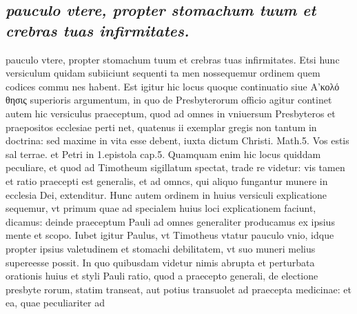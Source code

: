 \documentclass{article}
\begin{document}
\begin{pages}
\subsection*{\textit{pauculo vtere, propter stomachum tuum et crebras tuas infirmitates.}}pauculo vtere, propter stomachum tuum et crebras tuas infirmitates. Etsi hunc versiculum quidam subiiciunt sequenti ta men nossequemur ordinem quem codices commu nes habent. Est igitur hic locus quoque continuatio siue Α’κολό θησις superioris argumentum, in quo de Presbyterorum officio agitur continet autem hic versiculus praeceptum, quod ad omnes in vniuersum Presbyteros et praepositos ecclesiae perti net, quatenus ii exemplar gregis non tantum in doctrina: sed maxime in vita esse debent, iuxta dictum Christi. Math.5. Vos estis sal terrae. et Petri in 1.epistola cap.5. Quamquam enim hic locus quiddam peculiare, et quod ad Timotheum sigillatum spectat, trade re videtur: vis tamen et ratio praecepti est generalis, et ad omncs, qui aliquo fungantur munere in ecclesia Dei, extenditur. Hunc autem ordinem in huius versiculi explicatione sequemur, vt primum quae ad specialem huius loci explicationem faciunt, dicamus: deinde praeceptum Pauli ad omnes generaliter producamus ex ipsius mente et scopo. Iubet igitur Paulus, vt Timotheus vtatur pauculo vnio, idque propter ipsius valetudinem et stomachi debilitatem, vt suo muneri melius supereesse possit. In quo quibusdam videtur nimis abrupta et perturbata orationis huius et styli Pauli ratio, quod a praecepto generali, de electione presbyte rorum, statim transeat, aut potius transuolet ad praecepta medicinae: et ea, quae peculiariter ad  \pend

\end{pages}
\end{document}
